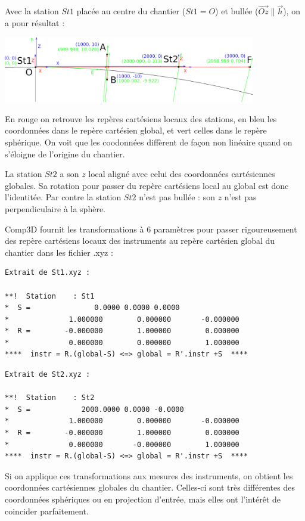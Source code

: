 \documentclass[french]{report}
\begin{document}
Avec la station $St1$ placée au centre du chantier ($St1=O$) et bullée ($\overrightarrow{Oz} \| \overrightarrow{h}$),
on a pour résultat :

\begin{center}
\includegraphics[width = 11cm]{images/ex_approx_spher_xyz_global}
\end{center}
En rouge on retrouve les repères cartésiens locaux des stations, en bleu les coordonnées dans le repère cartésien global, et vert celles dans le repère sphérique.
On voit que les coodonnées diffèrent de façon non linéaire quand on s'éloigne de l'origine du chantier.

La station $St2$ a son $z$ local aligné avec celui des coordonnées cartésiennes globales. Sa rotation pour passer
du repère cartésiens local au global est donc l'identitée. Par contre la station $St2$ n'est pas bullée : son $z$
n'est pas perpendiculaire à la sphère.

Comp3D fournit les transformations à 6 paramètres pour passer rigoureusement des repère cartésiens locaux
des instruments au repère cartésien global du chantier dans les fichier .xyz :

\begin{verbatim}
Extrait de St1.xyz :

**!  Station    : St1
*  S =               0.0000 0.0000 0.0000
*              1.000000        0.000000       -0.000000
*  R =        -0.000000        1.000000        0.000000
*              0.000000        0.000000        1.000000
****  instr = R.(global-S) <=> global = R'.instr +S  ****
\end{verbatim}

\begin{verbatim}
Extrait de St2.xyz :

**!  Station    : St2
*  S =            2000.0000 0.0000 -0.0000
*              1.000000        0.000000       -0.000000
*  R =        -0.000000        1.000000        0.000000
*              0.000000       -0.000000        1.000000
****  instr = R.(global-S) <=> global = R'.instr +S  ****
\end{verbatim}

Si on applique ces transformations aux mesures des instruments,
on obtient les coordonnées cartésiennes globales du chantier.
Celles-ci sont très différentes des coordonnées sphériques ou en projection d'entrée,
mais elles ont l'intérêt de coincider parfaitement.
\end{document}
